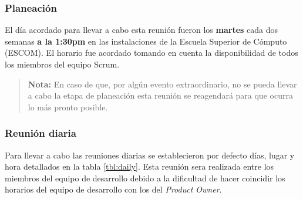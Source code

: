 \clearpage

\subsubsection{Planeación}

 \noindent El día acordado para llevar a cabo esta reunión fueron los {\bf martes} cada dos semanas
 {\bf a la 1:30pm} en las instalaciones de la Escuela Superior de Cómputo (ESCOM). El horario fue
 acordado tomando en cuenta la disponibilidad de todos los miembros del equipo Scrum.

    \begin{quote}
    {\bf Nota:} En caso de que, por algún evento extraordinario, no se pueda
                llevar a cabo la etapa de planeación esta reunión se reagendará
                para que ocurra lo más pronto posible.
    \end{quote}

\subsubsection{Reunión diaria}

 \noindent
 Para llevar a cabo las reuniones diarias se establecieron por defecto días, lugar y hora detallados
 en la tabla \ref{tbl:daily}. Esta reunión sera realizada entre los miembros del equipo de desarrollo
 debido a la dificultad de hacer coincidir los horarios del equipo de desarrollo con los del {\it Product
 Owner}.

